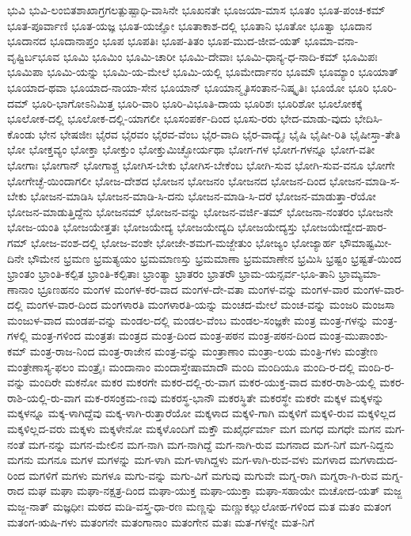 {ಭುವಿ
ಭುವಿ-ಲಂಬಿತಶಾಖಾಗ್ರಗಲತ್ಪುಷ್ಪಾಧಿ-ವಾಸಿನೇ
ಭೂಖನತೇ
ಭೂಜಯಾ-ಮಾಸ
ಭೂತಂ
ಭೂತ-ಪಂಚ-ಕಮ್
ಭೂತ-ಪೂರ್ವಾಣಿ
ಭೂತ-ಯಜ್ಞ
ಭೂತ-ಯಜ್ಞೋ
ಭೂತಾಕಾಶ-ದಲ್ಲಿ
ಭೂತಾನಿ
ಭೂತೋ
ಭೂತ್ವಾ
ಭೂದಾನ
ಭೂದಾನದ
ಭೂದಾನಾಪ್ತಂ
ಭೂಪ
ಭೂಪತಿಃ
ಭೂಪ-ತಿತಂ
ಭೂಪ-ಮುದ-ಜೀವ-ಯತ್
ಭೂಮಾ-ವನಾ-ವೃಷ್ಟಿರ್ಬಭೂವ
ಭೂಮಿ
ಭೂಮಿಂ
ಭೂಮಿ-ಚಾರೀ
ಭೂಮಿ-ದೇವಾಃ
ಭೂಮಿ-ಧಾನ್ಯ-ಧ-ನಾದಿ-ಕಮ್
ಭೂಮಿಪಃ
ಭೂಮಿಪಾ
ಭೂಮಿ-ಯನ್ನು
ಭೂಮಿ-ಯ-ಮೇಲೆ
ಭೂಮಿ-ಯಲ್ಲಿ
ಭೂಮೇರ್ದಾನಂ
ಭೂಮೌ
ಭೂಮ್ಯಾಂ
ಭೂಯಾತ್
ಭೂಯಾದ-ಥವಾ
ಭೂಯಾದ-ನಾಯಾ-ಸೇನ
ಭೂಯಾನ್
ಭೂಯಾನ್ಮೃತಿಸಂತಾನ-ನಿಷ್ಕೃತಿಃ
ಭೂಯೋ
ಭೂರಿ
ಭೂರಿ-ದಮ್
ಭೂರಿ-ಭಾಗೋಽನಿಮಿತ್ತ
ಭೂರಿ-ವಾರಿ
ಭೂರಿ-ವಿಭೂತಿ-ದಾಯ
ಭೂರಿಶಃ
ಭೂರಿಶೋ
ಭೂಲೋಕಕ್ಕೆ
ಭೂಲೋಕ-ದಲ್ಲಿ
ಭೂಲೋಕ-ದಲ್ಲಿ-ಯಾಗಲೀ
ಭೂಸಂಪರ್ಕ-ದಿಂದ
ಭೂಸು-ರರು
ಭೇದ-ಮಾಡು-ವುದು
ಭೇದಿಸಿ-ಕೊಂಡು
ಭೇನ
ಭೇಷಜೀಃ
ಭೈರವ
ಭೈರವಂ
ಭೈರವ-ವೆಂಬ
ಭೈರ-ವಾದಿ
ಭೈರ-ವಾದ್ಯೈಃ
ಭೈಷಿ
ಭೈಷೀ-ರಿತಿ
ಭೈಷೀಸ್ತಾ-ತೇತಿ
ಭೋ
ಭೋಕ್ತವ್ಯಂ
ಭೋಕ್ತಾ
ಭೋಕ್ತುಂ
ಭೋಕ್ತುಮಿಚ್ಛೋರ್ಯಥಾ
ಭೋಗ-ಗಳ
ಭೋಗ-ಗಳನ್ನೂ
ಭೋಗ-ವತೀ
ಭೋಗಾಃ
ಭೋಗಾನ್
ಭೋಗಾಶ್ಚ
ಭೋಗಿಸ-ಬೇಕು
ಭೋಗಿಸ-ಬೇಕೆಂಬ
ಭೋಗಿ-ಸುವ
ಭೋಗಿ-ಸುವ-ವನೂ
ಭೋಗೇ
ಭೋಗೇಚ್ಛೆ-ಯಿಂದಾಗಲೀ
ಭೋಜ-ದೇಶದ
ಭೋಜನ
ಭೋಜನಂ
ಭೋಜನದ
ಭೋಜನ-ದಿಂದ
ಭೋಜನ-ಮಾಡಿ-ಸ-ಬೇಕು
ಭೋಜನ-ಮಾಡಿಸಿ
ಭೋಜನ-ಮಾಡಿ-ಸಿ-ದನು
ಭೋಜನ-ಮಾಡಿ-ಸಿ-ದರೆ
ಭೋಜನ-ಮಾಡುತ್ತಾ-ರೆಯೋ
ಭೋಜನ-ಮಾಡುತ್ತಿದ್ದೆನು
ಭೋಜನಮ್
ಭೋಜನ-ವನ್ನು
ಭೋಜನ-ವರ್ಜಿ-ತಮ್
ಭೋಜನಾ-ನಂತರಂ
ಭೋಜನೇ
ಭೋಜ-ಯಂತಿ
ಭೋಜಯೇತ್ತತಃ
ಭೋಜಯೇದ್ಯ
ಭೋಜಯೇದ್ಯದಿ
ಭೋಜಯೇದ್ಯಸ್ತು
ಭೋಜಯೇದ್ವೇದ-ಪಾರ-ಗಮ್
ಭೋಜ-ವಂಶ-ದಲ್ಲಿ
ಭೋಜ-ವಂಶೇ
ಭೋಜೇ-ಶಮಗ-ಮಜ್ಜೇತುಂ
ಭೋಜ್ಯಂ
ಭೋಜ್ಯಾರ್ಹ
ಭೌಮಾಷ್ಟಮೀ-ದಿನೇ
ಭೌಮೇನ
ಭ್ರಮಣ
ಭ್ರಮತ್ಯಯಂ
ಭ್ರಮಮಾಣಸ್ತು
ಭ್ರಮಮಾಣಾ
ಭ್ರಮಮಾಣೇನ
ಭ್ರಮಿಸಿ
ಭ್ರಷ್ಟಂ
ಭ್ರಷ್ಟತೆ-ಯಿಂದ
ಭ್ರಾಂತಂ
ಭ್ರಾಂತಿ-ಕಲ್ಪಿತ
ಭ್ರಾಂತಿ-ಕಲ್ಪಿತಾಃ
ಭ್ರಾಂತ್ಯಾ
ಭ್ರಾತರಂ
ಭ್ರಾತರೌ
ಭ್ರಾಮ-ಯನ್ಸರ್ವ-ಭೂ-ತಾನಿ
ಭ್ರಾಮ್ಯಮಾ-ಣಾನಾಂ
ಭ್ರೂಣಹನಂ
ಮಂಗಳ
ಮಂಗಳ-ಕರ-ವಾದ
ಮಂಗಳ-ದೇ-ವತಾ
ಮಂಗಳ-ವನ್ನು
ಮಂಗಳ-ವಾರ
ಮಂಗಳ-ವಾರ-ದಲ್ಲಿ
ಮಂಗಳ-ವಾರ-ದಿಂದ
ಮಂಗಳಾರತಿ
ಮಂಗಳಾರತಿ-ಯನ್ನು
ಮಂಚದ-ಮೇಲೆ
ಮಂಚ-ವನ್ನು
ಮಂಜರಿ
ಮಂಜಸಾ
ಮಂಜುಳ-ವಾದ
ಮಂಡಪ-ವನ್ನು
ಮಂಡಲ-ದಲ್ಲಿ
ಮಂಡಲ-ವೆಂಬ
ಮಂಡಲ-ಸಂಜ್ಞಕೇ
ಮಂತ್ರ
ಮಂತ್ರ-ಗಳನ್ನು
ಮಂತ್ರ-ಗಳಲ್ಲಿ
ಮಂತ್ರ-ಗಳಿಂದ
ಮಂತ್ರತಃ
ಮಂತ್ರದ
ಮಂತ್ರ-ದಿಂದ
ಮಂತ್ರ-ಪಠನ
ಮಂತ್ರ-ಪಠನ-ದಿಂದ
ಮಂತ್ರ-ಮುಪಾಂಶು-ಕಮ್
ಮಂತ್ರ-ರಾಜ-ನಿಂದ
ಮಂತ್ರ-ರಾಜೇನ
ಮಂತ್ರ-ವನ್ನು
ಮಂತ್ರಾಣಾಂ
ಮಂತ್ರಾ-ಲಯ
ಮಂತ್ರಿ-ಗಳು
ಮಂತ್ರೇಣ
ಮಂತ್ರೇಣಾಸ್ಯ-ಫಲಂ
ಮಂತ್ರೈಃ
ಮಂದಾನಾಂ
ಮಂದಾಸ್ತೇಷಾಮಾದೌ
ಮಂದಿ
ಮಂದಿಯೂ
ಮಂದಿ-ರ-ದಲ್ಲಿ
ಮಂದಿ-ರ-ವನ್ನು
ಮಂದಿರೇ
ಮಕನೋ
ಮಕರ
ಮಕರಗೇ
ಮಕರ-ದಲ್ಲಿ-ರು-ವಾಗ
ಮಕರ-ಯುಕ್ತ-ವಾದ
ಮಕರ-ರಾಶಿ-ಯಲ್ಲಿ
ಮಕರ-ರಾಶಿ-ಯಲ್ಲಿ-ರು-ವಾಗ
ಮಕ-ರಸಂಕ್ರಮ-ಣವು
ಮಕರಸ್ಥ-ಭಾನೌ
ಮಕರಸ್ಥಿತೇ
ಮಕರಸ್ಥೇ
ಮಕರೇ
ಮಕ್ಕಳ
ಮಕ್ಕಳನ್ನು
ಮಕ್ಕಳನ್ನೂ
ಮಕ್ಕ-ಳಾಗಿದ್ದೆವು
ಮಕ್ಕ-ಳಾಗಿ-ರುತ್ತಾರೆಯೋ
ಮಕ್ಕಳಾದ
ಮಕ್ಕಳಿ-ಗಾಗಿ
ಮಕ್ಕಳಿಗೆ
ಮಕ್ಕಳಿ-ರುವ
ಮಕ್ಕಳಿಲ್ಲದ
ಮಕ್ಕಳಿಲ್ಲದ-ವರು
ಮಕ್ಕಳು
ಮಕ್ಕಳೇನೋ
ಮಕ್ಕಳೊಂದಿಗೆ
ಮಕ್ತೌ
ಮಖೈರ್ಧರ್ಮಾ
ಮಗ
ಮಗಧ
ಮಗಧೇ
ಮಗನ
ಮಗ-ನಂತೆ
ಮಗ-ನನ್ನು
ಮಗನ-ಮೇಲಿನ
ಮಗ-ನಾಗಿ
ಮಗ-ನಾಗಿದ್ದೆ
ಮಗ-ನಾಗಿ-ರುವ
ಮಗನಾದ
ಮಗ-ನಿಗೆ
ಮಗ-ನಿದ್ದನು
ಮಗನು
ಮಗನೂ
ಮಗಳ
ಮಗಳನ್ನು
ಮಗ-ಳಾಗಿ
ಮಗ-ಳಾಗಿದ್ದಳು
ಮಗ-ಳಾಗಿ-ರುವ-ವಳು
ಮಗಳಾದ
ಮಗಳಾದುದ-ರಿಂದ
ಮಗಳಿಗೆ
ಮಗಳು
ಮಗಳೂ
ಮಗು-ವನ್ನು
ಮಗು-ವಿಗೆ
ಮಗುವು
ಮಗುವೇ
ಮಗ್ನ-ರಾಗಿ
ಮಗ್ನರಾ-ಗಿ-ರುವ
ಮಗ್ನ-ರಾದ
ಮಘ
ಮಘಾ
ಮಘಾ-ನಕ್ಷತ್ರ-ದಿಂದ
ಮಘಾ-ಯುಕ್ತ
ಮಘಾ-ಯುಕ್ತಾ
ಮಘಾ-ಸಹಾಯೇ
ಮಚೋದ-ಯತ್
ಮಜ್ಜ
ಮಜ್ಜ-ನಾತ್
ಮಜ್ಞಧೀಃ
ಮಠದ
ಮಡಿ-ವಸ್ತ್ರ-ಧಾ-ರಣ
ಮಣ್ಣನ್ನು
ಮಣ್ಣುಕಲ್ಲುಲೋಹ-ಗಳಿಂದ
ಮತ
ಮತಂ
ಮತಂಗ
ಮತಂಗ-ಋಷಿ-ಗಳು
ಮತಂಗನೇ
ಮತಂಗಾನಾಂ
ಮತಂಗೇನ
ಮತಃ
ಮತ-ಗಳನ್ನೇ
ಮತ-ನಿಗೆ
}
